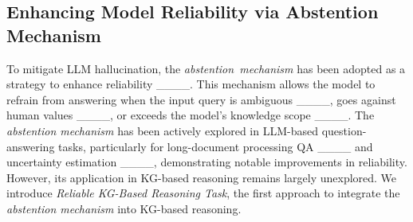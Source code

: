 \subsection{Enhancing Model Reliability via Abstention Mechanism}
To mitigate LLM hallucination, the \mbox{\textit{abstention mechanism}} has been adopted as a strategy to enhance reliability ____. This mechanism allows the model to refrain from answering when the input query is ambiguous ____, goes against human values ____, or exceeds the model's knowledge scope ____.  
The \textit{abstention mechanism} has been actively explored in LLM-based question-answering tasks, particularly for long-document processing QA ____ and uncertainty estimation ____, demonstrating notable improvements in reliability.
However, its application in KG-based reasoning remains largely unexplored.
We introduce \textit{Reliable KG-Based Reasoning Task}, the first approach to integrate the \textit{abstention mechanism} into KG-based reasoning.